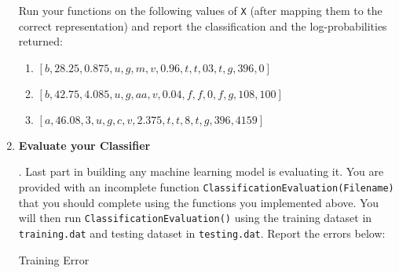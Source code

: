 \begin{enumerate}
     Run your functions on the following values of {\tt X} (after mapping them to the correct representation) and report the classification and the log-probabilities returned: 
    \begin{enumerate}
        \item $[b,28.25,0.875,u,g,m,v,0.96,t,t,03,t,g,396,0]$
        
        \begin{tcolorbox}[fit,height=1.5cm, width=12cm, blank, borderline={1pt}{-2pt},nobeforeafter]
        \end{tcolorbox}\hspace{2cm}
        
        \item $[b,42.75,4.085,u,g,aa,v,0.04,f,f,0,f,g,108,100]$
        
        \begin{tcolorbox}[fit,height=1.5cm, width=12cm, blank, borderline={1pt}{-2pt},nobeforeafter]
        \end{tcolorbox}\hspace{2cm}
        
        \item $[a,46.08,3,u,g,c,v,2.375,t,t,8,t,g,396,4159]$
        
        \begin{tcolorbox}[fit,height=1.5cm, width=12cm, blank, borderline={1pt}{-2pt},nobeforeafter]
        \end{tcolorbox}\hspace{2cm}
    \end{enumerate}
    
    \pagebreak
    \item \textbf{Evaluate your Classifier} 
    
    . Last part in building any machine learning model is evaluating it. You are provided with an incomplete function \texttt{ClassificationEvaluation(Filename)} that you should complete using the functions you implemented above. You will then run \texttt{ClassificationEvaluation()} using the training dataset in {\tt training.dat} and testing dataset in {\tt testing.dat}. Report the errors below:
    
    
    Training Error\\ \begin{tcolorbox}[fit,height=1.5cm, width=12cm, blank, borderline={1pt}{-2pt},nobeforeafter]
    \end{tcolorbox}\hspace{2cm}
    

\end{enumerate}
